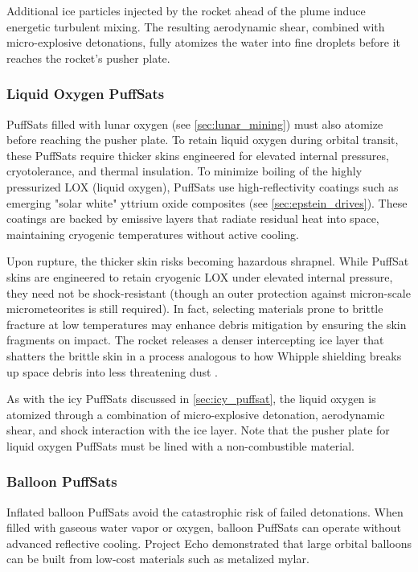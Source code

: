 \documentclass{article}
\begin{document}
Additional ice particles injected by the rocket ahead of the plume induce energetic turbulent mixing. The resulting aerodynamic shear, combined with micro-explosive detonations, fully atomizes the water into fine droplets before it reaches the rocket’s pusher plate.

\subsubsection{Liquid Oxygen PuffSats}\label{sec:lox_puffsat}
PuffSats filled with lunar oxygen (see \autoref{sec:lunar_mining}) must also atomize before reaching the pusher plate. To retain liquid oxygen during orbital transit, these PuffSats require thicker skins engineered for elevated internal pressures, cryotolerance, and thermal insulation. To minimize boiling of the highly pressurized LOX (liquid oxygen), PuffSats use high-reflectivity coatings such as emerging "solar white" yttrium oxide composites (see \autoref{sec:epstein_drives}).  These coatings are backed by emissive layers that radiate residual heat into space, maintaining cryogenic temperatures without active cooling.

Upon rupture, the thicker skin risks becoming hazardous shrapnel. While PuffSat skins are engineered to retain cryogenic LOX under elevated internal pressure, they need not be shock-resistant (though an outer protection against micron-scale micrometeorites is still required). In fact, selecting materials prone to brittle fracture at low temperatures may enhance debris mitigation by ensuring the skin fragments on impact. The rocket releases a denser intercepting ice layer that shatters the brittle skin in a process analogous to how Whipple shielding breaks up space debris into less threatening dust \cite{whipple_shield}.

As with the icy PuffSats discussed in \autoref{sec:icy_puffsat}, the liquid oxygen is atomized through a combination of micro-explosive detonation, aerodynamic shear, and shock interaction with the ice layer.  Note that the pusher plate for liquid oxygen PuffSats must be lined with a non-combustible material.

\subsubsection{Balloon PuffSats}
Inflated balloon PuffSats avoid the catastrophic risk of failed detonations.  When filled with gaseous water vapor or oxygen, balloon PuffSats can operate without advanced reflective cooling. Project Echo \cite{JPL_EchoQL2010} demonstrated that large orbital balloons can be built from low-cost materials such as metalized mylar.
\end{document}
